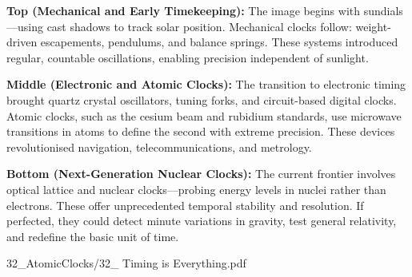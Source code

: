 \begin{SideNotePage}{
  \textbf{Top (Mechanical and Early Timekeeping):}  
  The image begins with sundials—using cast shadows to track solar position. Mechanical clocks follow: weight-driven escapements, pendulums, and balance springs. These systems introduced regular, countable oscillations, enabling precision independent of sunlight. \par

  \textbf{Middle (Electronic and Atomic Clocks):}  
  The transition to electronic timing brought quartz crystal oscillators, tuning forks, and circuit-based digital clocks. Atomic clocks, such as the cesium beam and rubidium standards, use microwave transitions in atoms to define the second with extreme precision. These devices revolutionised navigation, telecommunications, and metrology. \par

  \textbf{Bottom (Next-Generation Nuclear Clocks):}  
  The current frontier involves optical lattice and nuclear clocks—probing energy levels in nuclei rather than electrons. These offer unprecedented temporal stability and resolution. If perfected, they could detect minute variations in gravity, test general relativity, and redefine the basic unit of time. \par
}{32_AtomicClocks/32_ Timing is Everything.pdf}
\end{SideNotePage}
